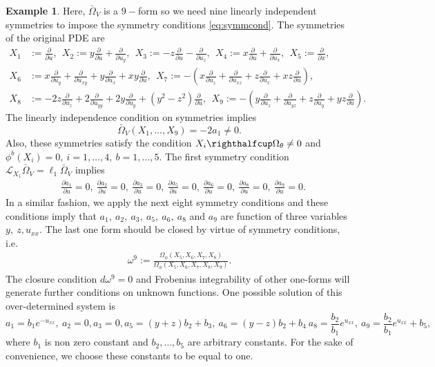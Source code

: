 \documentclass[a4paper, 11pt]{amsart}
\theoremstyle{definition}
\newtheorem{example}[theorem]{Example}
\begin{document}
\begin{example}
Here, $\bar{\Omega}_V$ is a $9-$form so we need nine linearly independent symmetries to impose the symmetry conditions \eqref{eq:symmcond}. The symmetries of the original PDE are
\begin{align*}
X_1&:={\frac{\partial}{\partial{u}}},~~ X_2:=y{\frac{\partial}{\partial{u}}}+{\frac{\partial}{\partial{u_y}}},~~ X_3:=-z{\frac{\partial}{\partial{u}}}-{\frac{\partial}{\partial{u_z}}},~~ X_4:=x{\frac{\partial}{\partial{u}}}+{\frac{\partial}{\partial{u_x}}},~~ X_5:={\frac{\partial}{\partial{x}}},\\
X_6&:=x{\frac{\partial}{\partial{u_y}}}+{\frac{\partial}{\partial{u_{xy}}}}+y{\frac{\partial}{\partial{u_x}}}+xy{\frac{\partial}{\partial{u}}},~~ X_7:=-(x{\frac{\partial}{\partial{u_z}}}+{\frac{\partial}{\partial{u_{xz}}}}+z{\frac{\partial}{\partial{u_x}}}+xz{\frac{\partial}{\partial{u}}}),\\
X_8&:=-2z{\frac{\partial}{\partial{u_z}}}+2{\frac{\partial}{\partial{u_{yy}}}}+2y{\frac{\partial}{\partial{u_{y}}}}+(y^2-z^2){\frac{\partial}{\partial{u}}},~~X_9:=-(y{\frac{\partial}{\partial{u_z}}}+{\frac{\partial}{\partial{u_{yz}}}}+z{\frac{\partial}{\partial{u_y}}}+yz{\frac{\partial}{\partial{u}}}).
\end{align*}
The linearly independence condition on symmetries implies \[\bar{\Omega}_V(X_1,\ldots,X_{9})=-2a_1\neq 0.\] Also, these symmetries satisfy the condition $X_i\righthalfcup \Omega_\theta\neq 0$ and $\phi^b(X_i)= 0,~i=1,\ldots,4,~b=1,\ldots,5.$
The first symmetry condition $\mathcal{L}_{X_1}\bar{\Omega}_V =\ell_1\bar{\Omega}_V$ implies
\begin{align*}
&{\frac{\partial{a_1}}{\partial{u}}}=0,~{\frac{\partial{a_2}}{\partial{u}}}=0,~{\frac{\partial{a_3}}{\partial{u}}}=0,~{\frac{\partial{a_5}}{\partial{u}}}=0,~{\frac{\partial{a_6}}{\partial{u}}}=0,~{\frac{\partial{a_8}}{\partial{u}}}=0,~{\frac{\partial{a_9}}{\partial{u}}}=0.
\end{align*}
In a similar fashion, we apply the next eight symmetry conditions and these conditions imply that $a_1,~a_2,~a_3,~a_5,~a_6,~a_8$ and $a_9$ are function of three variables $y,~z,u_{xx}.$ The last one form should be closed by virtue of symmetry conditions, i.e.
\begin{align*}
  \omega^{9}:=\frac{\Omega_\phi(X_5,X_6,X_7,X_8)}{\Omega_\phi(X_5,X_6,X_7,X_8,X_9)} .
\end{align*}
The closure condition $d\omega^{9}=0$  and Frobenius integrability of other one-forms will generate further conditions on unknown functions. One possible solution of this over-determined system is
\[a_1=b_1e^{-u_{xx}},~a_2=0,a_3=0,a_5=(y+z)b_2+b_3,~a_6=(y-z)b_2+b_4~a_8=\frac{b_2}{b_1}e^{u_{xx}},~a_9=\frac{b_2}{b_1}e^{u_{xx}}+b_5,\]
where $b_1$ is non zero constant and $b_2,\ldots,b_5$ are arbitrary constants. For the sake of convenience, we choose these constants to be equal to one.


\end{example}
\end{document}
